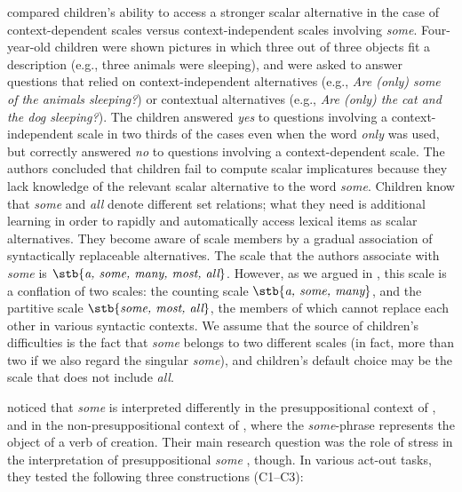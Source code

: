 \documentclass[output=paper]{langscibook}
\begin{document}
\citet{barner2011accessing} compared children's ability to access a stronger scalar alternative in the case of context-dependent scales versus context-independent scales involving \textit{some}. Four-year-old children were shown pictures in which three out of three objects fit a description (e.g., three animals were sleeping), and were asked to answer questions that relied on context-independent alternatives (e.g., \textit{Are (only) some of the animals sleeping?}) or contextual alternatives (e.g., \textit{Are (only) the cat and the dog sleeping?}). The children answered \textit{yes} to questions involving a context-independent scale in two thirds of the cases even when the word \textit{only} was used, but correctly answered \textit{no} to questions involving a context-dependent scale. The authors concluded that children fail to compute scalar implicatures because they lack knowledge of the relevant scalar alternative to the word \textit{some}. Children know that \textit{some} and \textit{all} denote different set relations; what they need is additional learning in order to rapidly and automatically access lexical items as scalar alternatives. They become aware of scale members by a gradual association of syntactically replaceable alternatives.  The scale that the authors associate with \textit{some} is $\stb{\textit{a, some, many, most, all}}$. However, as we argued in , this scale is a conflation of two scales: the counting scale $\stb{\textit{a, some, many}}$, and the partitive scale $\stb{\textit{some, most, all}}$,  the members of which cannot replace each other in various syntactic contexts. We assume that the source of children’s difficulties is the fact that \textit{some} belongs to two different scales (in fact, more than two if we also regard the singular \textit{some}), and children’s default choice may be the scale that does not include \textit{all}.

\citet{miller2005young} noticed that \textit{some} is interpreted differently in the presuppositional context of , and in the non-presuppositional context of , where the \textit{some}-phrase represents the object of a verb of creation. Their main research question was the role of stress in the interpretation of presuppositional \textit{some} , though. In various act-out tasks, they tested the following three constructions (C1--C3):

\eal
{}
\zl
\end{document}
